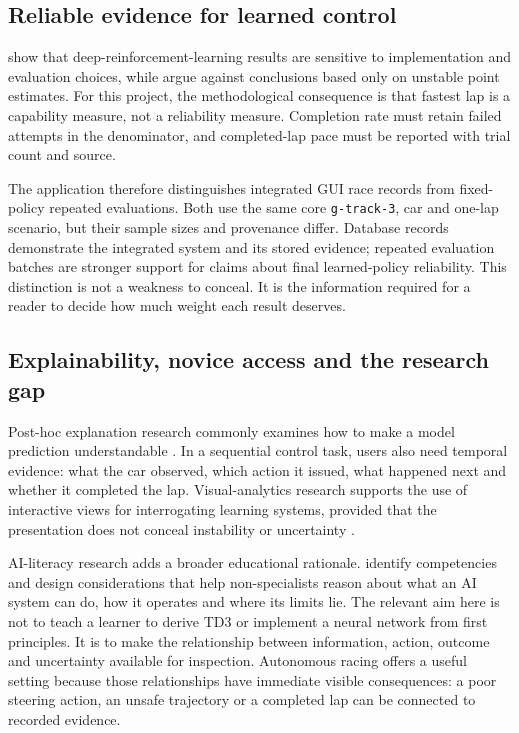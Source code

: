 \subsection{Reliable evidence for learned control}

\textcite{henderson2018} show that deep-reinforcement-learning results are sensitive to implementation and evaluation choices, while \textcite{agarwal2021} argue against conclusions based only on unstable point estimates. For this project, the methodological consequence is that fastest lap is a capability measure, not a reliability measure. Completion rate must retain failed attempts in the denominator, and completed-lap pace must be reported with trial count and source.

The application therefore distinguishes integrated GUI race records from fixed-policy repeated evaluations. Both use the same core \texttt{g-track-3}, car and one-lap scenario, but their sample sizes and provenance differ. Database records demonstrate the integrated system and its stored evidence; repeated evaluation batches are stronger support for claims about final learned-policy reliability. This distinction is not a weakness to conceal. It is the information required for a reader to decide how much weight each result deserves.

\subsection{Explainability, novice access and the research gap}

Post-hoc explanation research commonly examines how to make a model prediction understandable \parencite{ribeiro2016,guidotti2019}. In a sequential control task, users also need temporal evidence: what the car observed, which action it issued, what happened next and whether it completed the lap. Visual-analytics research supports the use of interactive views for interrogating learning systems, provided that the presentation does not conceal instability or uncertainty \parencite{hohman2019}.

AI-literacy research adds a broader educational rationale. \textcite{long2020} identify competencies and design considerations that help non-specialists reason about what an AI system can do, how it operates and where its limits lie. The relevant aim here is not to teach a learner to derive TD3 or implement a neural network from first principles. It is to make the relationship between information, action, outcome and uncertainty available for inspection. Autonomous racing offers a useful setting because those relationships have immediate visible consequences: a poor steering action, an unsafe trajectory or a completed lap can be connected to recorded evidence.

